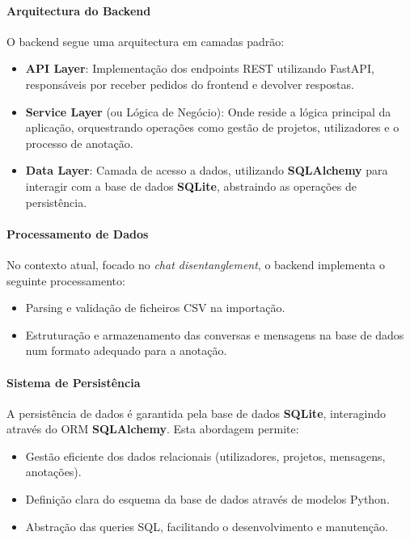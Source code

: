 \paragraph{Arquitectura do Backend}
O backend segue uma arquitectura em camadas padrão:

\begin{itemize}
    \item \textbf{API Layer}: Implementação dos endpoints REST utilizando FastAPI, responsáveis por receber pedidos do frontend e devolver respostas.
    \item \textbf{Service Layer} (ou Lógica de Negócio): Onde reside a lógica principal da aplicação, orquestrando operações como gestão de projetos, utilizadores e o processo de anotação.
    \item \textbf{Data Layer}: Camada de acesso a dados, utilizando \textbf{SQLAlchemy} para interagir com a base de dados \textbf{SQLite}, abstraindo as operações de persistência.
\end{itemize}

\paragraph{Processamento de Dados}
No contexto atual, focado no \textit{chat disentanglement}, o backend implementa o seguinte processamento:

\begin{itemize}
    \item Parsing e validação de ficheiros CSV na importação.
    \item Estruturação e armazenamento das conversas e mensagens na base de dados num formato adequado para a anotação.
\end{itemize}

\paragraph{Sistema de Persistência}
A persistência de dados é garantida pela base de dados \textbf{SQLite}, interagindo através do ORM \textbf{SQLAlchemy}. Esta abordagem permite:

\begin{itemize}
    \item Gestão eficiente dos dados relacionais (utilizadores, projetos, mensagens, anotações).
    \item Definição clara do esquema da base de dados através de modelos Python.
    \item Abstração das queries SQL, facilitando o desenvolvimento e manutenção.
\end{itemize}

